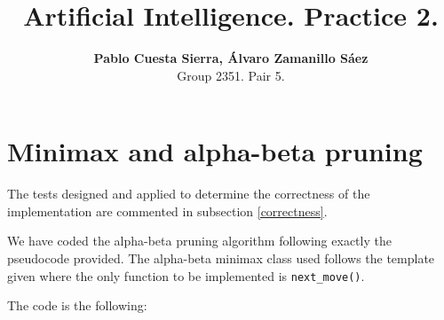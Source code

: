 \documentclass{article}
\title{\textbf{Artificial Intelligence. Practice 2.}}
\author{\textbf{Pablo Cuesta Sierra, Álvaro Zamanillo Sáez} \\Group 2351. Pair 5.}
\begin{document}
\vspace*{-1.5cm}
{\let\newpage\relax\maketitle}

\tableofcontents

\pagebreak

\section{Minimax and alpha-beta pruning}

The tests designed and applied to determine the correctness of the implementation are commented in subsection \ref{correctness}.

We have coded the alpha-beta pruning algorithm following exactly the pseudocode provided. The alpha-beta minimax class used follows the template given where the only function to be implemented is \texttt{next\_move()}.  

The code is the following:
\end{document}
